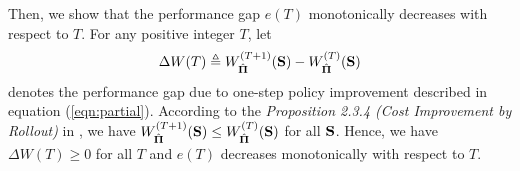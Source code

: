 Then, we show that the performance gap $e(T)$ monotonically decreases with respect to $T$.
For any positive integer $T$, let
{\small
\begin{align*}
    \Delta{W}(T) \triangleq W^{(T+1)}_{\hat{\boldsymbol{\Pi}}}(\mathbf{S}) - W^{(T)}_{\hat{\boldsymbol{\Pi}}}(\mathbf{S})
\end{align*}
}%
denotes the performance gap due to one-step policy improvement described in equation (\ref{eqn:partial}).
According to the \emph{Proposition 2.3.4 (Cost Improvement by Rollout)} in \cite{dp-control}, we have $W^{(T+1)}_{\hat{\boldsymbol{\Pi}}}(\mathbf{S}) \leq W^{(T)}_{\hat{\boldsymbol{\Pi}}}(\mathbf{S})$ for all $\mathbf{S}$.
Hence, we have $\Delta{W}(T) \geq 0$ for all $T$ and $e(T)$ decreases monotonically with respect to $T$.
